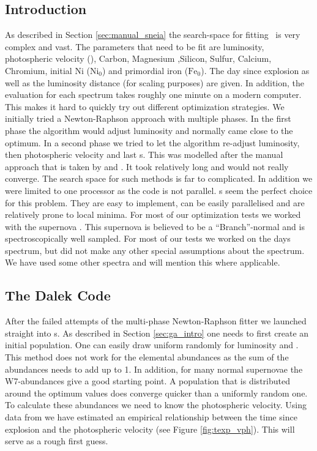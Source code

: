 \subsection{Introduction}
As described in Section \ref{sec:manual_sneia} the search-space for fitting \sneia\ is very complex and vast. The parameters that need to be fit are luminosity, photospheric velocity (\vph), Carbon, Magnesium ,Silicon, Sulfur, Calcium, Chromium, initial Ni ($\textrm{Ni}_0$) and primordial iron ($\textrm{Fe}_0$). The day since explosion as well as the luminosity distance (for scaling purposes) are given. In addition, the evaluation for each spectrum takes roughly one minute on a modern computer. This makes it hard to quickly try out different optimization strategies. We initially tried a Newton-Raphson approach with multiple phases. In the first phase the algorithm would adjust luminosity and normally came close to the optimum. In a second phase we tried to let the algorithm re-adjust luminosity, then photospheric velocity and last \ige s. This was modelled after the manual approach that is taken by \citet{hachinger_dipl2007} and \citep{hachinger_phd2011}. It took relatively long and would not really converge. The search space for such methods is far to complicated. In addition we were limited to one processor as the code is not parallel. \ga s seem the perfect choice for this problem. They are easy to implement, can be easily parallelised and are relatively prone to local minima. 
For most of our optimization tests we worked with the supernova  \citep{2004MNRAS.348..261B}. This supernova is believed to be a ``Branch''-normal and is spectroscopically well sampled. For most of our tests we worked on the  days spectrum, but did not make any other special assumptions about the spectrum. We have used some other spectra and will mention this where applicable.

\subsection{The Dalek Code}

After the failed attempts of the multi-phase Newton-Raphson fitter we launched straight into \ga s. As described in Section \ref{sec:ga_intro} one needs to first create an initial population. One can easily draw uniform randomly for luminosity and \vph. This method does not work for the elemental abundances as the sum of the abundances needs to add up to 1. In addition, for many normal supernovae the W7-abundances  \citep{1984ApJ...286..644N} give a good starting point. A population that is distributed around the optimum values does converge quicker than a uniformly random one. To calculate these abundances we need to know the photospheric velocity. Using data from \citet{2005ApJ...623.1011B} we have estimated an empirical relationship between the time since explosion and the photospheric velocity (see Figure \ref{fig:texp_vph}). This will serve as a rough first guess.

